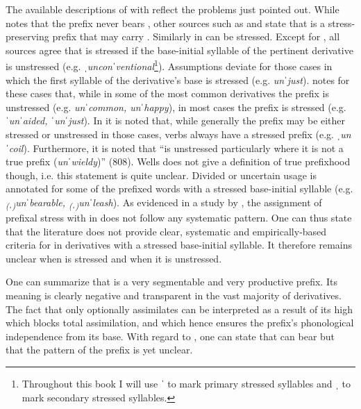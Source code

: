The available descriptions of  with  reflect the problems just pointed out. While \citet[4]{Allen.1978} notes that the prefix never bears , other sources such as \citet[464f.]{Jespersen.1965} and \citet[126]{Okada.2013} state that  is a stress-preserving prefix that may carry . Similarly in \cite{Wells.2008}  can be stressed. Except for \cite{Allen.1978}, all sources agree that  is stressed if the base-initial syllable of the pertinent derivative is unstressed (e.g. \textit{ˌunconˈventional}\footnote{Throughout this book I will use ˈ to mark primary stressed syllables and ˌ to mark secondary stressed syllables.}).
Assumptions deviate for those cases in which the first syllable of the derivative's base is stressed (e.g. \textit{unˈjust}). \citet[464f.]{Jespersen.1965} notes for these cases that, while in some of the most common derivatives the prefix is unstressed (e.g. \textit{unˈcommon, unˈhappy}), in most cases the prefix is stressed (e.g. \textit{ˈunˈaided, ˈunˈjust}). 
In \citet[808]{Wells.2008} it is noted that, while generally the prefix may be either stressed or unstressed in those cases, verbs always have a stressed prefix (e.g. \textit{ˌunˈcoil}). Furthermore, it is noted that  ``is unstressed particularly where it is not a true prefix (\textit{unˈwieldy})'' (808). Wells does not give a definition of true prefixhood though, i.e. this statement is quite unclear. Divided or uncertain usage is annotated for some of the prefixed words with a stressed base-initial syllable (e.g. \textit{\textsubscript{(}ˌ\textsubscript{)}unˈbearable, \textsubscript{(}ˌ\textsubscript{)}unˈleash}). As evidenced in a study by \citet[2ff.]{Hanote.2010}, the assignment of prefixal stress with  in \cite{Wells.2008} does not follow any systematic pattern.
One can thus state that the literature does not provide clear, systematic and empirically-based criteria for  in derivatives with a stressed base-initial syllable. It therefore remains unclear when  is stressed and when it is unstressed. 


One can summarize that  is a very segmentable and very productive prefix. Its meaning is clearly negative and transparent in the vast majority of derivatives. The fact that  only optionally assimilates can be interpreted as a result of its high  which blocks total assimilation, and  which hence ensures the prefix's phonological independence from its base. With regard to , one can state that  can bear  but that the  pattern of the prefix is yet unclear.



